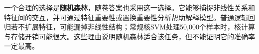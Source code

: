 一个合理的选择是\textbf{随机森林}，随卷答案也采用这一选择。它能够捕捉非线性关系和特征间的交互，并可通过特征重要性或置换重要性分析帮助解释模型。普通逻辑回归若不扩展特征，可能漏掉非线性结构；常规核SVM处理50,000个样本时，核计算与存储开销可能很大。这些理由说明随机森林适合该任务，但不能证明它的准确率一定最高。
